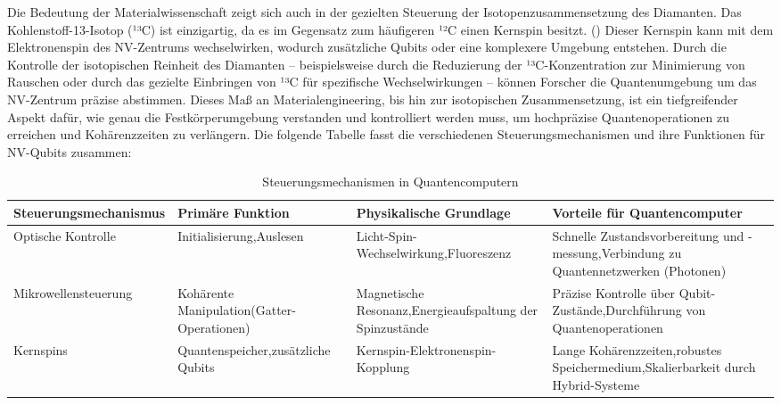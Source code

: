 Die Bedeutung der Materialwissenschaft zeigt sich auch in der gezielten Steuerung der Isotopenzusammensetzung des Diamanten. Das Kohlenstoff-13-Isotop (¹³C) ist einzigartig, da es im Gegensatz zum häufigeren ¹²C einen Kernspin besitzt. (\cite{QuantenSpeicherMitLangzeitgedaechtnis}) Dieser Kernspin kann mit dem Elektronenspin des NV-Zentrums wechselwirken, wodurch zusätzliche Qubits oder eine komplexere Umgebung entstehen. Durch die Kontrolle der isotopischen Reinheit des Diamanten – beispielsweise durch die Reduzierung der ¹³C-Konzentration zur Minimierung von Rauschen oder durch das gezielte Einbringen von ¹³C für spezifische Wechselwirkungen – können Forscher die Quantenumgebung um das NV-Zentrum präzise abstimmen. Dieses Maß an Materialengineering, bis hin zur isotopischen Zusammensetzung, ist ein tiefgreifender Aspekt dafür, wie genau die Festkörperumgebung verstanden und kontrolliert werden muss, um hochpräzise Quantenoperationen zu erreichen und Kohärenzzeiten zu verlängern.
Die folgende Tabelle fasst die verschiedenen Steuerungsmechanismen und ihre Funktionen für NV-Qubits zusammen:
\begin{table}[htbp]
\centering
\caption{Steuerungsmechanismen in Quantencomputern}
\begin{tabular}{|p{3cm}|p{3cm}|p{4cm}|p{5cm}|}
\hline
\textbf{Steuerungsmechanismus} & \textbf{Primäre Funktion} & \textbf{Physikalische Grundlage} & \textbf{Vorteile für Quantencomputer} \\
\hline
Optische Kontrolle & Initialisierung,\newline Auslesen & Licht-Spin-Wechselwirkung,\newline Fluoreszenz & Schnelle Zustandsvorbereitung und -messung,\newline Verbindung zu Quantennetzwerken (Photonen) \\
\hline
Mikrowellensteuerung & Kohärente Manipulation\newline (Gatter-Operationen) & Magnetische Resonanz,\newline Energieaufspaltung der Spinzustände & Präzise Kontrolle über Qubit-Zustände,\newline Durchführung von Quantenoperationen \\
\hline
Kernspins & Quantenspeicher,\newline zusätzliche Qubits & Kernspin-Elektronenspin-Kopplung & Lange Kohärenzzeiten,\newline robustes Speichermedium,\newline Skalierbarkeit durch Hybrid-Systeme \\
\hline
\end{tabular}
\end{table}
